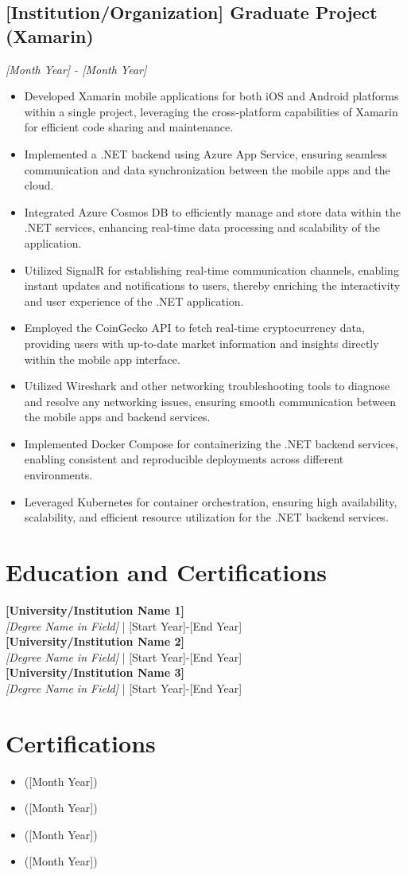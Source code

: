 \documentclass[a4paper,10pt]{article}
\begin{document}
\subsection*{[Institution/Organization] Graduate Project (Xamarin)}
\textit{[Month Year] - [Month Year]}
\begin{itemize}[noitemsep]
\item Developed Xamarin mobile applications for both iOS and Android platforms within a single project, leveraging the cross-platform capabilities of Xamarin for efficient code sharing and maintenance.
\item Implemented a .NET backend using Azure App Service, ensuring seamless communication and data synchronization between the mobile apps and the cloud.
\item Integrated Azure Cosmos DB to efficiently manage and store data within the .NET services, enhancing real-time data processing and scalability of the application.
\item Utilized SignalR for establishing real-time communication channels, enabling instant updates and notifications to users, thereby enriching the interactivity and user experience of the .NET application.
\item Employed the CoinGecko API to fetch real-time cryptocurrency data, providing users with up-to-date market information and insights directly within the mobile app interface.
\item Utilized Wireshark and other networking troubleshooting tools to diagnose and resolve any networking issues, ensuring smooth communication between the mobile apps and backend services.
\item Implemented Docker Compose for containerizing the .NET backend services, enabling consistent and reproducible deployments across different environments.
\item Leveraged Kubernetes for container orchestration, ensuring high availability, scalability, and efficient resource utilization for the .NET backend services.
\end{itemize}


\section*{Education and Certifications}
\textbf{[University/Institution Name 1]}\\
\textit{[Degree Name in Field]} | [Start Year]-[End Year]\\
\textbf{[University/Institution Name 2]}\\
\textit{[Degree Name in Field]} | [Start Year]-[End Year]\\
\textbf{[University/Institution Name 3]}\\
\textit{[Degree Name in Field]} | [Start Year]-[End Year]\\


\section*{Certifications}
\begin{itemize}
    \item [Certification Name 1] ([Month Year])
    \item [Certification Name 2] ([Month Year])
    \item [Certification Name 3] ([Month Year])
    \item [Certification Name 4] ([Month Year])
\end{itemize}
\end{document}
